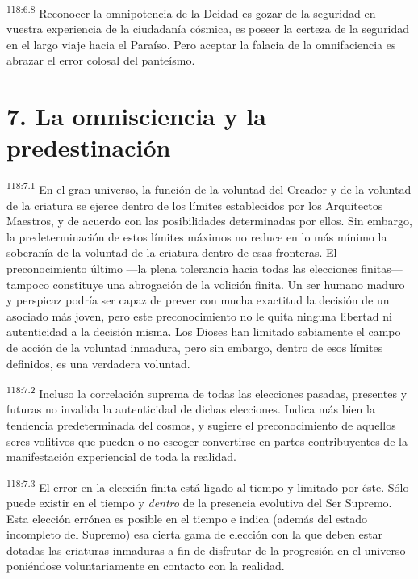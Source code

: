 \documentclass[twoside, 11pt]{book}
\begin{document}
\par
\textsuperscript{118:6.8} Reconocer la omnipotencia de la Deidad es gozar de la seguridad en vuestra experiencia de la ciudadanía cósmica, es poseer la certeza de la seguridad en el largo viaje hacia el Paraíso. Pero aceptar la falacia de la omnifaciencia es abrazar el error colosal del panteísmo.

\section*{7. La omnisciencia y la predestinación}
\par
\textsuperscript{118:7.1} En el gran universo, la función de la voluntad del Creador y de la voluntad de la criatura se ejerce dentro de los límites establecidos por los Arquitectos Maestros, y de acuerdo con las posibilidades determinadas por ellos. Sin embargo, la predeterminación de estos límites máximos no reduce en lo más mínimo la soberanía de la voluntad de la criatura dentro de esas fronteras. El preconocimiento último ---la plena tolerancia hacia todas las elecciones finitas--- tampoco constituye una abrogación de la volición finita. Un ser humano maduro y perspicaz podría ser capaz de prever con mucha exactitud la decisión de un asociado más joven, pero este preconocimiento no le quita ninguna libertad ni autenticidad a la decisión misma. Los Dioses han limitado sabiamente el campo de acción de la voluntad inmadura, pero sin embargo, dentro de esos límites definidos, es una verdadera voluntad.

\par
\textsuperscript{118:7.2} Incluso la correlación suprema de todas las elecciones pasadas, presentes y futuras no invalida la autenticidad de dichas elecciones. Indica más bien la tendencia predeterminada del cosmos, y sugiere el preconocimiento de aquellos seres volitivos que pueden o no escoger convertirse en partes contribuyentes de la manifestación experiencial de toda la realidad.

\par
\textsuperscript{118:7.3} El error en la elección finita está ligado al tiempo y limitado por éste. Sólo puede existir en el tiempo y \textit{dentro} de la presencia evolutiva del Ser Supremo. Esta elección errónea es posible en el tiempo e indica (además del estado incompleto del Supremo) esa cierta gama de elección con la que deben estar dotadas las criaturas inmaduras a fin de disfrutar de la progresión en el universo poniéndose voluntariamente en contacto con la realidad.
\end{document}
